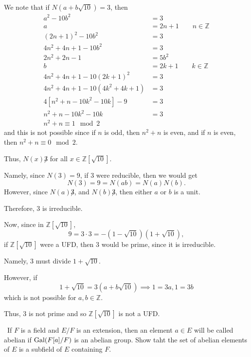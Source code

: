 \documentclass[12pt]{Qual}
\begin{document}
\begin{solution}
We note that if $N(a+b\sqrt{10})=3$, then \begin{align*}
    a^2-10b^2&=3\\
    a&=2n+1\qquad n\in\mathbb{Z}\\
    (2n+1)^2-10b^2&=3\\
    4n^2+4n+1-10b^2&=3\\
    2n^2+2n-1&=5b^2\\
    b&=2k+1\qquad k\in\mathbb{Z}\\
    4n^2+4n+1-10(2k+1)^2&=3\\
    4n^2+4n+1-10(4k^2+4k+1)&=3\\
    4[n^2+n-10k^2-10k]-9&=3\\
    n^2+n-10k^2-10k&=3\\
    n^2+n\equiv 1\mod 2
\end{align*} and this is not possible since if $n$ is odd, then $n^2+n$ is even, and if $n$ is even, then $n^2+n\equiv 0\mod 2$.

Thus, $N(x)\not3$ for all $x\in\mathbb{Z}[\sqrt{10}].$

Namely, since $N(3)=9$, if $3$ were reducible, then we would get $$N(3)=9=N(ab)=N(a)N(b).$$ However, since $N(a)\not3$, and $N(b)\not3$, then either $a$ or $b$ is a unit.

Therefore, $3$ is irreducible.

Now, since in $\mathbb{Z}[\sqrt{10}]$, $$9=3\cdot 3=-(1-\sqrt{10})(1+\sqrt{10}),$$ if $\mathbb{Z}[\sqrt{10}]$ were a UFD, then $3$ would be prime, since it is irreducible.

Namely, $3$ must divide $1+\sqrt{10}$.

However, if $$1+\sqrt{10}=3(a+b\sqrt{10})\implies 1=3a, 1=3b$$ which is not possible for $a,b\in\mathbb{Z}$.

Thus, $3$ is not prime and so $\mathbb{Z}[\sqrt{10}]$ is not a UFD.
\end{solution}
\newpage

\begin{problem} $\,$
If $F$ is a field and $E/F$ is an extension, then an element $a\in E$ will be called abelian if $\text{Gal}(F[a]/F)$ is an abelian group. Show taht the set of abelian elements of $E$ is a subfield of $E$ containing $F$.
\end{problem}
\end{document}
